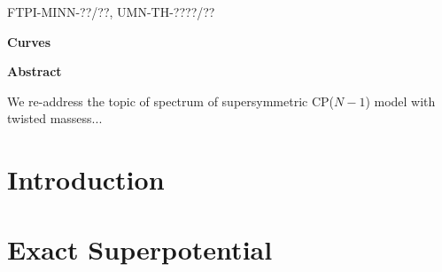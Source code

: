 \documentclass[epsfig,12pt]{article}
\begin{document}



\begin{titlepage}

\begin{flushright}
FTPI-MINN-??/??, UMN-TH-????/??\\
\end{flushright}


\begin{center}
{  \Large \bf  Curves}
\end{center}



\vspace{2mm}


\begin{center}
{\large\bf Abstract}
\end{center}

\hspace{0.3cm}
We re-address the topic of spectrum of supersymmetric CP($N-1$) model with twisted massess...
\vspace{2cm}


\end{titlepage}


\newpage

\section{Introduction}
\setcounter{equation}{0}


\section{Exact Superpotential}
\end{document}
